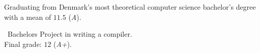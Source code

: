Graduating from Denmark's most theoretical computer science bachelor's degree with a mean of $11.5$ (\emph{A}).

\medskip

\faFileO\ Bachelors Project in writing a compiler. \\ Final grade: $12$ (\emph{A+}).
